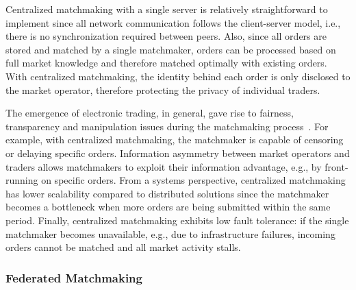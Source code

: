 Centralized matchmaking with a single server is relatively straightforward to implement since all network communication follows the client-server model, i.e., there is no synchronization required between peers.
Also, since all orders are stored and matched by a single matchmaker, orders can be processed based on full market knowledge and therefore matched optimally with existing orders.
With centralized matchmaking, the identity behind each order is only disclosed to the market operator, therefore protecting the privacy of individual traders.

The emergence of electronic trading, in general, gave rise to fairness, transparency and manipulation issues during the matchmaking process~\cite{mavroudis2019libra}.
For example, with centralized matchmaking, the matchmaker is capable of censoring or delaying specific orders.
Information asymmetry between market operators and traders allows matchmakers to exploit their information advantage, e.g., by front-running on specific orders.
From a systems perspective, centralized matchmaking has lower scalability compared to distributed solutions since the matchmaker becomes a bottleneck when more orders are being submitted within the same period.
Finally, centralized matchmaking exhibits low fault tolerance: if the single matchmaker becomes unavailable, e.g., due to infrastructure failures, incoming orders cannot be matched and all market activity stalls.


\subsubsection{Federated Matchmaking}

